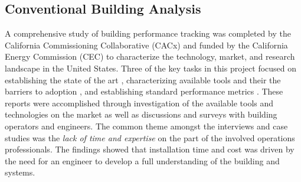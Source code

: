 \subsection{Conventional Building Analysis}
A comprehensive study of building performance tracking was completed by the California Commissioning Collaborative (CACx) and funded by the California Energy Commission (CEC) to characterize the technology, market, and research landscape in the United States. Three of the key tasks in this project focused on establishing the state of the art \cite{Effinger:2010tm}, characterizing available tools and their the barriers to adoption \cite{Ulickey:2010ut}, and establishing standard performance metrics \cite{Greensfelder:2010wl}. These reports were accomplished through investigation of the available tools and technologies on the market as well as discussions and surveys with building operators and engineers. The common theme amongst the interviews and case studies was the \emph{lack of time and expertise} on the part of the involved operations professionals. The findings showed that installation time and cost was driven by the need for an engineer to develop a full understanding of the building and systems. 